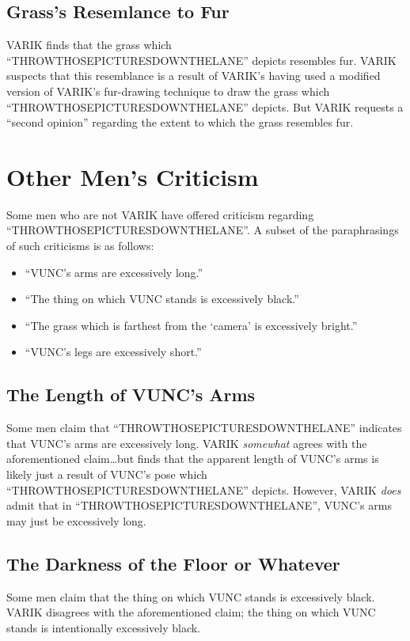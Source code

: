 \documentclass{report}
\begin{document}
\subsection{Grass's Resemlance to Fur}
VARIK finds that the grass which ``THROWTHOSEPICTURESDOWNTHELANE'' depicts resembles fur.  VARIK suspects that this resemblance is a result of VARIK's having used a modified version of VARIK's fur-drawing technique to draw the grass which ``THROWTHOSEPICTURESDOWNTHELANE'' depicts.  But VARIK requests a ``second opinion'' regarding the extent to which the grass resembles fur.

\section{Other Men's Criticism}
Some men who are not VARIK have offered criticism regarding ``THROWTHOSEPICTURESDOWNTHELANE''.  A subset of the paraphrasings of such criticisms is as follows:

\begin{itemize}
	\item ``VUNC's arms are excessively long.''
	\item ``The thing on which VUNC stands is excessively black.''
	\item ``The grass which is farthest from the `camera' is excessively bright.''
	\item ``VUNC's legs are excessively short.''
\end{itemize}

\subsection{The Length of VUNC's Arms}
Some men claim that ``THROWTHOSEPICTURESDOWNTHELANE'' indicates that VUNC's arms are excessively long.  VARIK \textit{somewhat} agrees with the aforementioned claim\ldots but finds that the apparent length of VUNC's arms is likely just a result of VUNC's pose which ``THROWTHOSEPICTURESDOWNTHELANE'' depicts.  However, VARIK \textit{does} admit that in ``THROWTHOSEPICTURESDOWNTHELANE'', VUNC's arms may just be excessively long.

\subsection{The Darkness of the Floor or Whatever}
Some men claim that the thing on which VUNC stands is excessively black.  VARIK disagrees with the aforementioned claim; the thing on which VUNC stands is intentionally excessively black.
\end{document}
